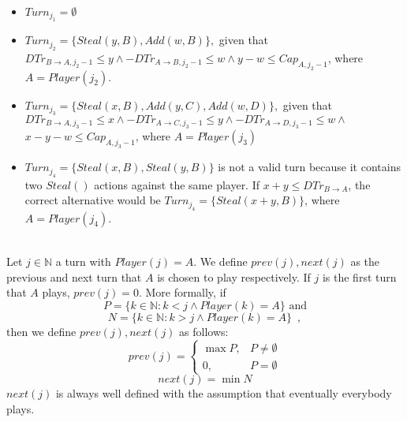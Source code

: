 \documentclass[11pt]{llncs}
\begin{document}
     \begin{itemize}
        \item $Turn_{j_1} = \emptyset$
        \item $Turn_{j_2} = \{Steal\left(y, B\right), Add\left(w, B\right)\},$ given that $DTr_{B \rightarrow A, j_2 - 1}
        \leq y \wedge -DTr_{A \rightarrow B, j_2 - 1} \leq w \wedge y - w \leq Cap_{A, j_2-1}$, where $A =
        Player\left(j_2\right).$
        \item $Turn_{j_3} = \{Steal\left(x, B\right), Add\left(y, C\right), Add\left(w, D\right)\},$ given that \\
        $DTr_{B \rightarrow A, j_3 - 1} \leq x \wedge -DTr_{A \rightarrow C, j_3-1} \leq y \wedge
        -DTr_{A \rightarrow D, j_3 - 1} \leq w \wedge$ $x - y - w \leq Cap_{A, j_3-1}$, where $A = Player\left(j_3\right)$
        \item $Turn_{j_4} = \{Steal\left(x, B\right), Steal\left(y, B\right)\}$ is not a valid turn because it contains two
        $Steal\left(\right)$ actions against the same player. If $x + y \leq DTr_{B \rightarrow A}$, the correct alternative
        would be $Turn_{j_4} = \{Steal\left(x+y, B\right)\}$, where $A = Player\left(j_4\right)$.
     \end{itemize}
     \begin{definition} \ \\
        Let $j \in \mathbb{N}$ a turn with $Player\left(j\right) = A$. We define $prev\left(j\right), next\left(j\right)$ as
        the previous and next turn that $A$ is chosen to play respectively. If $j$ is the first turn that $A$ plays,
        $prev\left(j\right) = 0$. More formally, if
        \begin{equation}
           P = \{k \in \mathbb{N} : k < j \wedge Player\left(k\right) = A\} \mbox{ and}
        \end{equation}
        \begin{equation}
           N = \{k \in \mathbb{N} : k > j \wedge Player\left(k\right) = A\} \enspace,
        \end{equation}
        then we define $prev\left(j\right), next\left(j\right)$ as follows:
        \begin{equation}
           prev\left(j\right) = \begin{cases}
              \max{P}, & P \neq \emptyset \\
              0, & P = \emptyset
           \end{cases}
        \end{equation}
        \begin{equation}
           next\left(j\right) = \min{N}
        \end{equation}
        $next\left(j\right)$ is always well defined with the assumption that eventually everybody plays.
     \end{definition}
\end{document}
